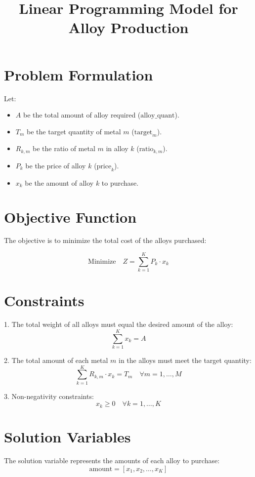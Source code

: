 \documentclass{article}
\begin{document}
\title{Linear Programming Model for Alloy Production}
\author{}
\date{}
\maketitle

\section*{Problem Formulation}

Let:
\begin{itemize}
    \item \( A \) be the total amount of alloy required (\( \text{alloy\_quant} \)).
    \item \( T_m \) be the target quantity of metal \( m \) (\( \text{target}_{m} \)).
    \item \( R_{k,m} \) be the ratio of metal \( m \) in alloy \( k \) (\( \text{ratio}_{k, m} \)).
    \item \( P_k \) be the price of alloy \( k \) (\( \text{price}_{k} \)).
    \item \( x_k \) be the amount of alloy \( k \) to purchase.
\end{itemize}

\section*{Objective Function}

The objective is to minimize the total cost of the alloys purchased:

\[
\text{Minimize} \quad Z = \sum_{k=1}^{K} P_k \cdot x_k
\]

\section*{Constraints}

1. The total weight of all alloys must equal the desired amount of the alloy:
\[
\sum_{k=1}^{K} x_k = A
\]

2. The total amount of each metal \( m \) in the alloys must meet the target quantity:
\[
\sum_{k=1}^{K} R_{k,m} \cdot x_k = T_m \quad \forall m = 1, \ldots, M
\]

3. Non-negativity constraints:
\[
x_k \geq 0 \quad \forall k = 1, \ldots, K
\]

\section*{Solution Variables}

The solution variable represents the amounts of each alloy to purchase:
\[
\text{amount} = [x_1, x_2, \ldots, x_K]
\]
\end{document}
